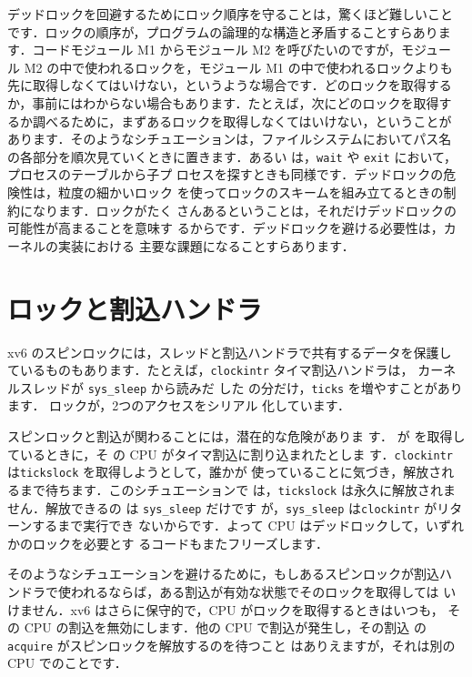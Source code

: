 デッドロックを回避するためにロック順序を守ることは，驚くほど難しいこと
です．ロックの順序が，プログラムの論理的な構造と矛盾することすらありま
す．コードモジュール M1 からモジュール M2 を呼びたいのですが，モジュー
ル M2 の中で使われるロックを，モジュール M1 の中で使われるロックよりも
先に取得しなくてはいけない，というような場合です．どのロックを取得する
か，事前にはわからない場合もあります．たとえば，次にどのロックを取得す
るか調べるために，まずあるロックを取得しなくてはいけない，ということが
あります．そのようなシチュエーションは，ファイルシステムにおいてパス名
の各部分を順次見ていくときに置きます．あるい
は，\texttt{wait} や \texttt{exit} において，プロセスのテーブルから子プ
ロセスを探すときも同様です．デッドロックの危険性は，粒度の細かいロック
を使ってロックのスキームを組み立てるときの制約になります．ロックがたく
さんあるということは，それだけデッドロックの可能性が高まることを意味す
るからです．デッドロックを避ける必要性は，カーネルの実装における
主要な課題になることすらあります．

\section{ロックと割込ハンドラ}

xv6 のスピンロックには，スレッドと割込ハンドラで共有するデータを保護し
ているものもあります．たとえば，\lstinline{clockintr} タイマ割込ハンドラは，
カーネルスレッドが \lstinline{sys_sleep}  から読みだ
した  の分だけ，\lstinline{ticks}
を増やすことがあります． ロックが，2つのアクセスをシリアル
化しています．

スピンロックと割込が関わることには，潜在的な危険がありま
す． が  を取得しているときに，そ
の CPU がタイマ割込に割り込まれたとしま
す．\lstinline{clockintr} は\lstinline{tickslock} を取得しようとして，誰かが
使っていることに気づき，解放されるまで待ちます．このシチュエーションで
は，\lstinline{tickslock} は永久に解放されません．解放できるの
は \lstinline{sys_sleep} だけです
が，\lstinline{sys_sleep} は\lstinline{clockintr} がリターンするまで実行でき
ないからです．よって CPU はデッドロックして，いずれかのロックを必要とす
るコードもまたフリーズします．

そのようなシチュエーションを避けるために，もしあるスピンロックが割込ハ
ンドラで使われるならば，ある割込が有効な状態でそのロックを取得しては
いけません．xv6 はさらに保守的で，CPU がロックを取得するときはいつも，
その CPU の割込を無効にします．他の CPU で割込が発生し，その割込
の \lstinline{acquire} がスピンロックを解放するのを待つこと
はありえますが，それは別の CPU でのことです．

